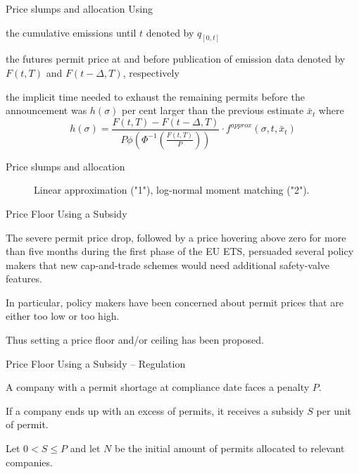 
{Price slumps and allocation}
Using


	the cumulative emissions until $t$ denoted by $q_{[0,t]}$

	the futures permit price at and before publication of emission data denoted by $F(t,T)$ and $F(t - \Delta,T)$, respectively


the implicit time needed to exhaust the remaining permits before the announcement was $h(\sigma)$ per cent larger than the previous estimate $\bar{x}_t$ where
$$
h(\sigma) = \frac{F(t,T) - F(t-\Delta,T)}{P \phi\left( \Phi^{-1}\left(\frac{F(t,T)}{P}\right) \right)} \cdot f^{approx}(\sigma,t,\bar{x}_t)
$$


{Price slumps and allocation}
\begin{center}
\begin{figure}[h!]
\centering
{}
\caption{Linear approximation ("1"), log-normal moment matching ("2").}
\label{fig:plot11}
\end{figure}
\end{center}

{Price Floor Using a Subsidy}


	The severe permit price drop, followed by a price hovering above zero for more than five months during the first phase of the EU ETS, persuaded several policy makers that new cap-and-trade schemes would need additional safety-valve features.

	In particular, policy makers have been concerned about permit prices that are either too low or too high.

	Thus setting a price floor and/or ceiling has been proposed.


{Price Floor Using a Subsidy -- Regulation}


	A company with a permit shortage at compliance date faces a penalty $P$.

	If a company ends up with an excess of permits, it receives a subsidy $S$ per unit of permit.

	Let $0<S\leq P$ and let $N$ be the initial amount of permits allocated to relevant companies.

